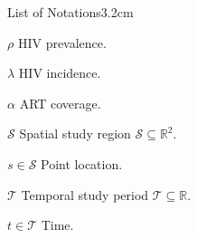 \begin{mclistof}{List of Notations}{3.2cm}

\item[$\rho$] HIV prevalence.
\item[$\lambda$] HIV incidence.
\item[$\alpha$] ART coverage.
\item[$\mathcal{S}$] Spatial study region $\mathcal{S} \subseteq \mathbb{R}^2$.
\item[$s \in \mathcal{S}$] Point location.
\item[$\mathcal{T}$] Temporal study period $\mathcal{T} \subseteq \mathbb{R}$.
\item[$t \in \mathcal{T}$] Time. 

\end{mclistof} 
